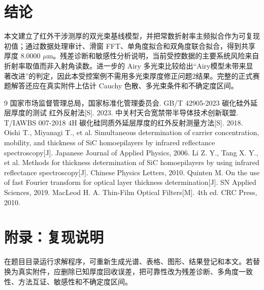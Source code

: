 \documentclass[UTF8]{ctexart}
\begin{document}
\section{结论}
本文建立了红外干涉测厚的双光束基线模型，并把常数折射率主频拟合作为可复现初值；通过数据处理审计、滑窗 FFT、单角度拟合和双角度联合拟合，得到共享厚度 8.0000 $\mu\mathrm{m}$。残差诊断和敏感性分析说明，当前受控数据的主要系统风险来自折射率取值而非入射角读数。进一步的 Airy 多光束比较给出“Airy模型未带来显著改进”的判定，因此本受控案例不需用多光束厚度修正问题2结果。完整的正式赛题解答还应在真实附件上估计 Cauchy 色散、多光束条件和不确定度区间。

\begin{thebibliography}{9}
 国家市场监督管理总局，国家标准化管理委员会. GB/T 42905-2023 碳化硅外延层厚度的测试 红外反射法[S]. 2023.
 中关村天合宽禁带半导体技术创新联盟. T/IAWBS 007-2018 4H 碳化硅同质外延层厚度的红外反射测量方法[S]. 2018.
 Oishi T., Miyanagi T., et al. Simultaneous determination of carrier concentration, mobility, and thickness of SiC homoepilayers by infrared reflectance spectroscopy[J]. Japanese Journal of Applied Physics, 2006.
 Li Z. Y., Tang X. Y., et al. Methods for thickness determination of SiC homoepilayers by using infrared reflectance spectroscopy[J]. Chinese Physics Letters, 2010.
 Quinten M. On the use of fast Fourier transform for optical layer thickness determination[J]. SN Applied Sciences, 2019.
 MacLeod H. A. Thin-Film Optical Filters[M]. 4th ed. CRC Press, 2010.
\end{thebibliography}

\appendix
\section{附录：复现说明}
在题目目录运行求解程序，可重新生成光谱、表格、图形、结果登记和本文。若替换为真实附件，应删除已知厚度回收误差，把可靠性改为残差诊断、多角度一致性、方法互证、敏感性和不确定度区间。
\end{document}
